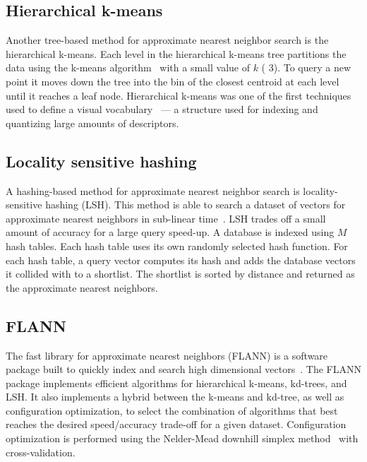         \subsection{Hierarchical k-means}
            Another tree-based method for approximate nearest neighbor search is the hierarchical k-means. Each
            level in the hierarchical k-means tree partitions the data using the k-means
            algorithm~\cite{lloyd_least_1982} with a small value of $k$ (\eg{} 3). To query a new point it moves
            down the tree into the bin of the closest centroid at each level until it reaches a leaf node.
            Hierarchical k-means was one of the first techniques used to define a visual
            vocabulary~\cite{nister_scalable_2006} --- a structure used for indexing and quantizing large amounts
            of descriptors.
        
        \subsection{Locality sensitive hashing}
            A hashing-based method for approximate nearest neighbor search is locality-sensitive hashing (LSH).
            This method is able to search a dataset of vectors for approximate nearest neighbors in sub-linear
            time~\cite{charikar_similarity_2002, datar_locality_sensitive_2004, kulis_fast_2009,
            kulis_kernelized_2012, tao_locality_2013}. LSH trades off a small amount of accuracy for a large query
            speed-up. A database is indexed using $M$ hash tables. Each hash table uses its own randomly selected
            hash function. For each hash table, a query vector computes its hash and adds the database vectors it
            collided with to a shortlist. The shortlist is sorted by distance and returned as the approximate
            nearest neighbors.

        \subsection{FLANN}
            The fast library for approximate nearest neighbors (FLANN) is a software package built to quickly index
            and search high dimensional vectors~\cite{muja_fast_2009}. The FLANN package implements efficient
            algorithms for hierarchical k-means, kd-trees, and LSH{}. It also implements a hybrid between the
            k-means and kd-tree, as well as configuration optimization, to select the combination of algorithms
            that best reaches the desired speed/accuracy trade-off for a given dataset. Configuration optimization
            is performed using the Nelder-Mead downhill simplex method~\cite{nelder_simplex_1965} with
            cross-validation.

